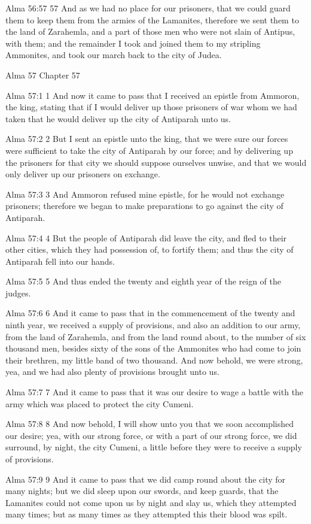 Alma 56:57
 57 And as we had no place for our prisoners, that we could guard
them to keep them from the armies of the Lamanites, therefore we
sent them to the land of Zarahemla, and a part of those men who
were not slain of Antipus, with them; and the remainder I took
and joined them to my stripling Ammonites, and took our march
back to the city of Judea.

Alma 57
Chapter 57

Alma 57:1
 1 And now it came to pass that I received an epistle from
Ammoron, the king, stating that if I would deliver up those
prisoners of war whom we had taken that he would deliver up the
city of Antiparah unto us.

Alma 57:2
 2 But I sent an epistle unto the king, that we were sure our
forces were sufficient to take the city of Antiparah by our
force; and by delivering up the prisoners for that city we should
suppose ourselves unwise, and that we would only deliver up our
prisoners on exchange.

Alma 57:3
 3 And Ammoron refused mine epistle, for he would not exchange
prisoners; therefore we began to make preparations to go against
the city of Antiparah.

Alma 57:4
 4 But the people of Antiparah did leave the city, and fled to
their other cities, which they had possession of, to fortify
them; and thus the city of Antiparah fell into our hands.

Alma 57:5
 5 And thus ended the twenty and eighth year of the reign of the
judges.

Alma 57:6
 6 And it came to pass that in the commencement of the twenty and
ninth year, we received a supply of provisions, and also an
addition to our army, from the land of Zarahemla, and from the
land round about, to the number of six thousand men, besides
sixty of the sons of the Ammonites who had come to join their
brethren, my little band of two thousand. And now behold, we
were strong, yea, and we had also plenty of provisions brought
unto us.

Alma 57:7
 7 And it came to pass that it was our desire to wage a battle
with the army which was placed to protect the city Cumeni.

Alma 57:8
 8 And now behold, I will show unto you that we soon accomplished
our desire; yea, with our strong force, or with a part of our
strong force, we did surround, by night, the city Cumeni, a
little before they were to receive a supply of provisions.

Alma 57:9
 9 And it came to pass that we did camp round about the city for
many nights; but we did sleep upon our swords, and keep guards,
that the Lamanites could not come upon us by night and slay us,
which they attempted many times; but as many times as they
attempted this their blood was spilt.


